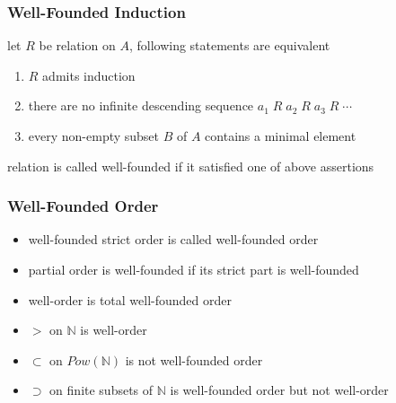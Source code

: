 \documentclass[12pt,aspectratio=169]{beamer}
\begin{document}
\begin{frame}
    \frametitle{Well-Founded Induction}

    \begin{theorem}
        let $R$ be relation on $A$, following statements are equivalent
        \begin{enumerate}
            \item $R$ admits induction
            \item there are no infinite descending sequence $a_1 \;R \; a_2 \; R \; a_3 \; R \; \cdots$
            \item every non-empty subset $B$ of $A$ contains a minimal element
        \end{enumerate}
    \end{theorem}
    \pause
    \begin{definition}
        relation is called \alert{well-founded} if it
        satisfied one of above assertions
    \end{definition}
\end{frame}

\begin{frame}
    \frametitle{Well-Founded Order}
    \begin{definition}
        \begin{itemize}
            \item well-founded strict order is called \alert{well-founded order}
            \item partial order is \alert{well-founded} if its strict part is well-founded
            \item \alert{well-order} is total well-founded order
        \end{itemize}
    \end{definition}
    \pause
    \begin{example}
        \begin{itemize}
            \pause
            \item $>$ on $\mathbb{N}$ is well-order
            \pause
            \item $\subset$ on $Pow(\mathbb{N})$ is not well-founded order
            \pause
            \item $\supset$ on finite subsets of $\mathbb{N}$ is well-founded order but not well-order
        \end{itemize}
    \end{example}
\end{frame}
\end{document}
